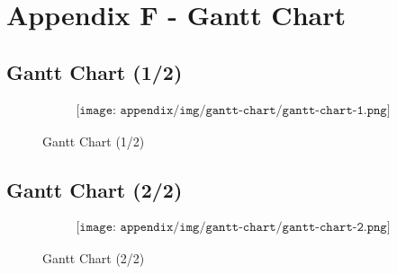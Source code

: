 \section{Appendix F - Gantt Chart} \label{sec:appF}
\subsection{Gantt Chart (1/2)}
\begin{figure}[H]
    \begin{align*}
        \texttt{[image: appendix/img/gantt-chart/gantt-chart-1.png]}
    \end{align*}
    \caption{Gantt Chart (1/2)}
    \label{fig:gantt-chart-1}
\end{figure}

\subsection{Gantt Chart (2/2)}

\begin{figure}[H]
    \begin{align*}
        \texttt{[image: appendix/img/gantt-chart/gantt-chart-2.png]}
    \end{align*}
    \caption{Gantt Chart (2/2)}
    \label{fig:gantt-chart-2}
\end{figure}
